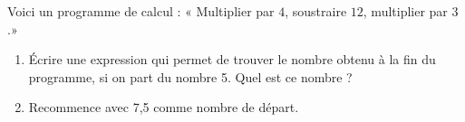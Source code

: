 
\begin{exercice}\label{exosmath-0737}

Voici un programme de calcul : « Multiplier par $4$, soustraire $12$, multiplier par $3$.» 
\begin{enumerate}
    \item
        Écrire une expression qui permet de trouver le nombre obtenu à la fin du programme, si on part du nombre 5. Quel est ce nombre ?  
    \item
        Recommence avec 7,5 comme nombre de départ.
\end{enumerate}

\end{exercice}
